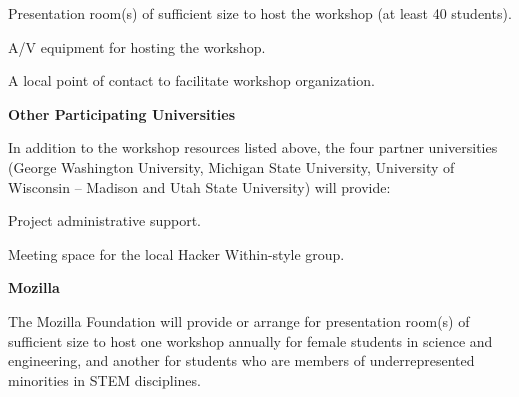 \documentclass{proposalnsf}
\newlength{\up}
\begin{document}
\begin{compactitem}

\item
  Presentation room(s) of sufficient size to host the workshop (at
  least 40 students).

\item
  A/V equipment for hosting the workshop.

\item
  A local point of contact to facilitate workshop organization.

\end{compactitem}

\textbf{Other Participating Universities}

In addition to the workshop resources listed above, the four partner
universities (George Washington University, Michigan State University,
University of Wisconsin -- Madison and Utah State University) will
provide:

\begin{compactitem}

\item
  Project administrative support.

\item
  Meeting space for the local Hacker Within-style group.

\end{compactitem}

\textbf{Mozilla}

The Mozilla Foundation will provide or arrange for presentation room(s)
of sufficient size to host one workshop annually for female students in
science and engineering, and another for students who are members of
underrepresented minorities in STEM disciplines.
\end{document}

